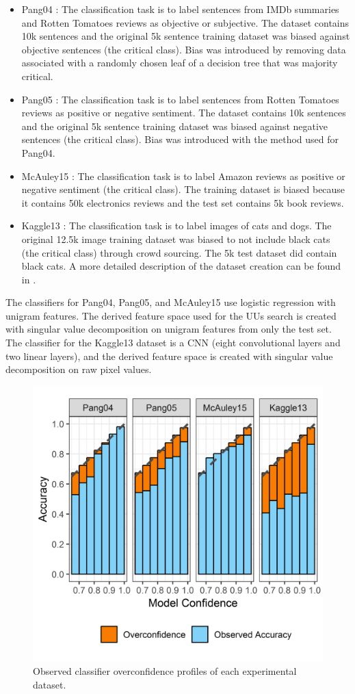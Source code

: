 \documentclass[letterpaper]{article} %
\begin{document}
\begin{itemize}
\item Pang04 \citep{pang2004}: The classification task is to label sentences from IMDb summaries and Rotten Tomatoes reviews as objective or subjective.  The dataset contains 10k sentences and the original 5k sentence training dataset was biased against objective sentences (the critical class). Bias was introduced by removing data associated with a randomly chosen leaf of a decision tree that was majority critical.  
\item Pang05 \citep{pang2005}: The classification task is to label sentences from Rotten Tomatoes reviews as positive or negative sentiment.  The dataset contains 10k sentences and the original 5k sentence training dataset was biased against negative sentences (the critical class). Bias was introduced with the method used for Pang04.  
\item McAuley15 \citep{mcauley2015}: The classification task is to label Amazon reviews as positive or negative sentiment (the critical class). The training dataset is biased because it contains 50k electronics reviews and the test set contains 5k book reviews.
\item Kaggle13 \citep{kaggle2013}: The classification task is to label images of cats and dogs.  The original 12.5k image training dataset was biased to not include black cats (the critical class) through crowd sourcing. The 5k test dataset did contain black cats. A more detailed description of the dataset creation can be found in \cite{Bansal2018}.
\end{itemize}

The classifiers for Pang04, Pang05, and McAuley15 use logistic regression with unigram features. The derived feature space used for the UUs search is created with singular value decomposition on unigram features from only the test set. The classifier for the Kaggle13 dataset is a CNN (eight convolutional layers and two linear layers), and the derived feature space is created with singular value decomposition on raw pixel values.

\begin{figure}[hbtp]
  \includegraphics[width=.45\textwidth]{overconfidence_2.png}
  \caption{Observed classifier overconfidence profiles of each experimental dataset.}
  \label{fig:overconf}
\end{figure}
\end{document}

